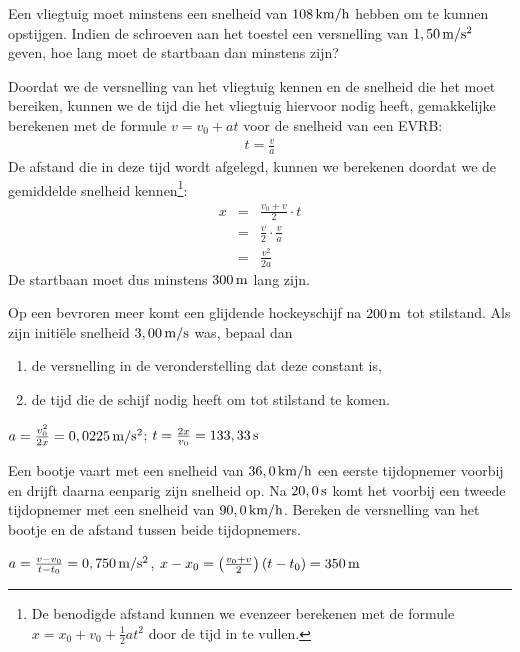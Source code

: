 \documentclass{ximera}
\begin{document}
\begin{exercise}
    Een vliegtuig moet minstens een snelheid van $108\rm\,km/h$ hebben om te kunnen opstijgen. Indien de schroeven aan het toestel een versnelling van $1,50\rm\,m/s^2$ geven, hoe lang moet de startbaan dan minstens zijn? 
    \begin{oplossing}
    Doordat we de versnelling van het vliegtuig kennen en de snelheid die het moet bereiken, kunnen we de tijd die het vliegtuig hiervoor nodig heeft, gemakkelijke berekenen met de formule $v=v_0+at$ voor de snelheid van een EVRB:
    \begin{eqnarray*}
        t=\frac{v}{a}
    \end{eqnarray*}
    De afstand die in deze tijd wordt afgelegd, kunnen we berekenen doordat we de gemiddelde snelheid kennen\footnote{De benodigde afstand kunnen we evenzeer berekenen met de formule $x=x_0+v_0+\frac{1}{2}at^2$ door de tijd in te vullen.}:
    \begin{eqnarray*}
    x&=&\frac{v_0+v}{2}\cdot t\\
    &=&\frac{v}{2}\cdot\frac{v}{a}\\
    &=&\frac{v^2}{2a}
    \end{eqnarray*}
    De startbaan moet dus minstens $300\rm\,m$ lang zijn.
    \end{oplossing}
\end{exercise}

\begin{exercise}
    Op een bevroren meer komt een glijdende hockeyschijf na $200\rm\,m$ tot stilstand. Als zijn initi\"ele snelheid $3,00\rm\,m/s$ was, bepaal dan
    \begin{enumerate}
        \item de versnelling in de veronderstelling dat deze constant is,
        \item de tijd die de schijf nodig heeft om tot stilstand te komen.
    \end{enumerate}
    \begin{oplossing}
        $a=\frac{v_0^2}{2x}=0,0225\rm\,m/s^2$; $t=\frac{2x}{v_0}=133,33\rm\,s$
    \end{oplossing}
\end{exercise}

\begin{exercise}
    Een bootje vaart met een snelheid van $36,0\rm\,km/h$ een eerste tijdopnemer voorbij en drijft daarna eenparig zijn snelheid op. Na $20,0\rm\,s$ komt het voorbij een tweede tijdopnemer met een snelheid van $90,0\rm\,km/h$. Bereken de versnelling van het bootje en de afstand tussen beide tijdopnemers.
    \begin{oplossing}
        $a=\frac{v-v_0}{t-t_0}=0,750\rm\,m/s^2$, $x-x_0=\left(\frac{v_0+v}{2}\right)(t-t_0)=350\rm\,m$
    \end{oplossing}
\end{exercise}
\end{document}
